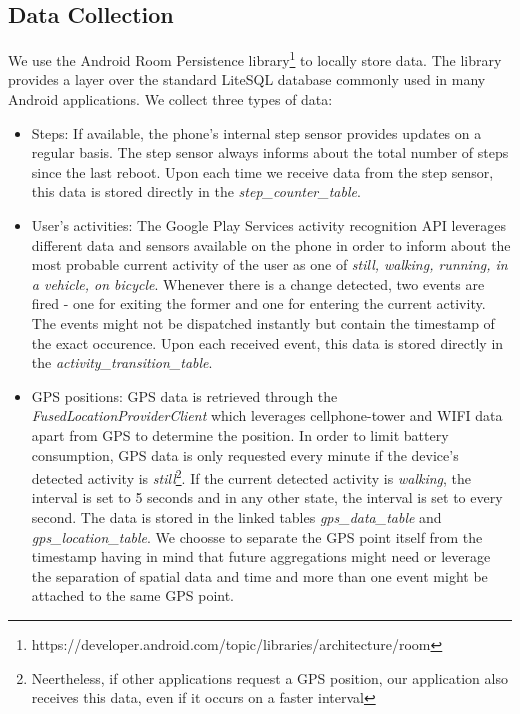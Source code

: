 \subsection {Data Collection}
We use the Android Room Persistence library\footnote{https://developer.android.com/topic/libraries/architecture/room} to locally store data. The library provides a layer over the standard LiteSQL database commonly used in many Android applications. We collect three types of data:
\begin{itemize}
	\item Steps: If available, the phone's internal step sensor provides updates on a regular basis. The step sensor always informs about the total number of steps since the last reboot. Upon each time we receive data from the step sensor, this data is stored directly in the \textit{step\_counter\_table}.
	\item User's activities: The Google Play Services  activity recognition API leverages different data and sensors available on the phone in order to inform about the most probable current activity of the user as one of \textit{still, walking, running, in a vehicle, on bicycle}. Whenever there is a change detected, two events are fired - one for exiting the former and one for entering the current activity. The events might not be dispatched instantly but contain the timestamp of the exact occurence. Upon each received event, this data is stored directly in the \textit{activity\_transition\_table}.
	\item GPS positions: GPS data is retrieved through the \textit{FusedLocationProviderClient} which leverages cellphone-tower and WIFI data apart from GPS to determine the position. In order to limit battery consumption, GPS data is only requested every minute if the device's detected activity is \textit{still}\footnote{Neertheless, if other applications request a GPS position, our application also receives this data, even if it occurs on a faster interval}. If the current detected activity is \textit{walking}, the interval is set to 5 seconds and in any other state, the interval is set to every second. The data is stored in the linked tables \textit{gps\_data\_table} and \textit{gps\_location\_table}. We choosse to separate the GPS point itself from the timestamp having in mind that future aggregations might need or leverage the separation of spatial data and time and more than one event might be attached to the same GPS point.
\end{itemize}

